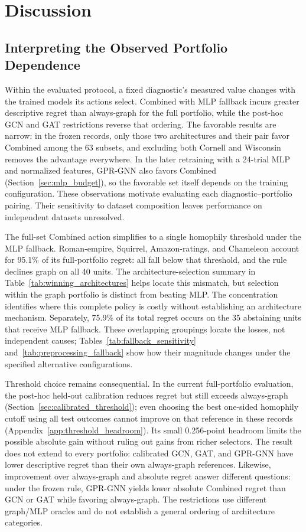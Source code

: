 \section{Discussion}
\label{sec:discussion}

\subsection{Interpreting the Observed Portfolio Dependence}
\label{sec:mismatch}

Within the evaluated protocol, a fixed diagnostic's measured value changes with the trained models its actions select. Combined with MLP fallback incurs greater descriptive regret than always-graph for the full portfolio, while the post-hoc GCN and GAT restrictions reverse that ordering. The favorable results are narrow: in the frozen records, only those two architectures and their pair favor Combined among the 63 subsets, and excluding both Cornell and Wisconsin removes the advantage everywhere. In the later retraining with a 24-trial MLP and normalized features, GPR-GNN also favors Combined (Section~\ref{sec:mlp_budget}), so the favorable set itself depends on the training configuration. These observations motivate evaluating each diagnostic--portfolio pairing. Their sensitivity to dataset composition leaves performance on independent datasets unresolved.

The full-set Combined action simplifies to a single homophily threshold under the MLP fallback. Roman-empire, Squirrel, Amazon-ratings, and Chameleon account for 95.1\% of its full-portfolio regret: all fall below that threshold, and the rule declines graph on all 40 units. The architecture-selection summary in Table~\ref{tab:winning_architectures} helps locate this mismatch, but selection within the graph portfolio is distinct from beating MLP. The concentration identifies where this complete policy is costly without establishing an architecture mechanism. Separately, 75.9\% of its total regret occurs on the 35 abstaining units that receive MLP fallback. These overlapping groupings locate the losses, not independent causes; Tables~\ref{tab:fallback_sensitivity} and~\ref{tab:preprocessing_fallback} show how their magnitude changes under the specified alternative configurations.

Threshold choice remains consequential. In the current full-portfolio evaluation, the post-hoc held-out calibration reduces regret but still exceeds always-graph (Section~\ref{sec:calibrated_threshold}); even choosing the best one-sided homophily cutoff using all test outcomes cannot improve on that reference in these records (Appendix~\ref{app:threshold_headroom}). Its small 0.256-point headroom limits the possible absolute gain without ruling out gains from richer selectors. The result does not extend to every portfolio: calibrated GCN, GAT, and GPR-GNN have lower descriptive regret than their own always-graph references. Likewise, improvement over always-graph and absolute regret answer different questions: under the frozen rule, GPR-GNN yields lower absolute Combined regret than GCN or GAT while favoring always-graph. The restrictions use different graph/MLP oracles and do not establish a general ordering of architecture categories.

